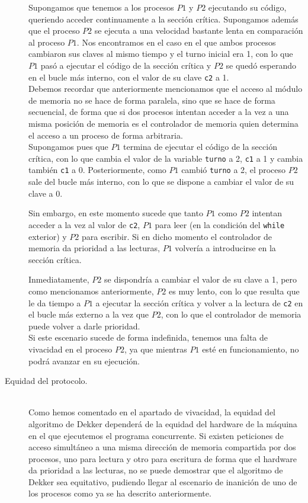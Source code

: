 \begin{description}
    Supongamos que tenemos a los procesos $P1$ y $P2$ ejecutando su código, queriendo acceder continuamente a la sección crítica. Supongamos además que el proceso $P2$ se ejecuta a una velocidad bastante lenta en comparación al proceso $P1$. Nos encontramos en el caso en el que ambos procesos cambiaron sus claves al mismo tiempo y el turno inicial era 1, con lo que $P1$ pasó a ejecutar el código de la sección crítica y $P2$ se quedó esperando en el bucle más interno, con el valor de su clave \verb|c2| a 1.\\

    Debemos recordar que anteriormente mencionamos que el acceso al módulo de memoria no se hace de forma paralela, sino que se hace de forma secuencial, de forma que si dos procesos intentan acceder a la vez a una misma posición de memoria es el controlador de memoria quien determina el acceso a un proceso de forma arbitraria.\\

    Supongamos pues que $P1$ termina de ejecutar el código de la sección crítica, con lo que cambia el valor de la variable \verb|turno| a 2, \verb|c1| a 1 y cambia también \verb|c1| a 0. Posteriormente, como $P1$ cambió \verb|turno| a 2, el proceso $P2$ sale del bucle más interno, con lo que se dispone a cambiar el valor de su clave a 0.

    Sin embargo, en este momento sucede que tanto $P1$ como $P2$ intentan acceder a la vez al valor de \verb|c2|, $P1$ para leer (en la condición del \verb|while| exterior) y $P2$ para escribir. Si en dicho momento el controlador de memoria da prioridad a las lecturas, $P1$ volvería a introducirse en la sección crítica.

    Inmediatamente, $P2$ se dispondría a cambiar el valor de su clave a 1, pero como mencionamos anteriormente, $P2$ es muy lento, con lo que resulta que le da tiempo a $P1$ a ejecutar la sección crítica y volver a la lectura de \verb|c2| en el bucle más externo a la vez que $P2$, con lo que el controlador de memoria puede volver a darle prioridad.\\

    Si este escenario sucede de forma indefinida, tenemos una falta de vivacidad en el proceso $P2$, ya que mientras $P1$ esté en funcionamiento, no podrá avanzar en su ejecución.

    \item [Equidad del protocolo.]~\\
    Como hemos comentado en el apartado de vivacidad, la equidad del algoritmo de Dekker dependerá de la equidad del hardware de la máquina en el que ejecutemos el programa concurrente. Si existen peticiones de acceso simultáneo a una misma dirección de memoria compartida por dos procesos, uno para lectura y otro para escritura de forma que el hardware da prioridad a las lecturas, no se puede demostrar que el algoritmo de Dekker sea equitativo, pudiendo llegar al escenario de inanición de uno de los procesos como ya se ha descrito anteriormente.
\end{description}

